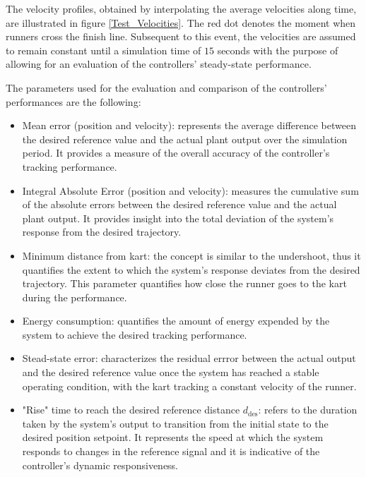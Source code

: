 \documentclass[a4paper,12pt,oneside]{book}
\begin{document}
The velocity profiles, obtained by interpolating the average velocities along time, are illustrated in figure \ref{Test_Velocities}.
The red dot denotes the moment when runners cross the finish line.
Subsequent to this event, the velocities are assumed to remain constant until a simulation time of $15$ seconds with the purpose of allowing for an evaluation of the controllers' steady-state performance.

\bigskip
The parameters used for the evaluation and comparison of the controllers' performances are the following:
\begin{itemize}
	\item Mean error (position and velocity): represents the average difference between the desired reference value and the actual plant output over the simulation period. It provides a measure of the overall accuracy of the controller's tracking performance.
	\item Integral Absolute Error (position and velocity): measures the cumulative sum of the absolute errors between the desired reference value and the actual plant output. It provides insight into the total deviation of the system's response from the desired trajectory.
	\item Minimum distance from kart: the concept is similar to the undershoot, thus it quantifies the extent to which the system's response deviates from the desired trajectory. This parameter quantifies how close the runner goes to the kart during the performance.
	\item Energy consumption: quantifies the amount of energy expended by the system to achieve the desired tracking performance.
	\item Stead-state error: characterizes the residual errror between the actual output and the desired reference value once the system has reached a stable operating condition, with the kart tracking a constant velocity of the runner.
	\item "Rise" time to reach the desired reference distance $d_\text{des}$: refers to the duration taken by the system's output to transition from the initial state to the desired position setpoint. It represents the speed at which the system responds to changes in the reference signal and it is indicative of the controller's dynamic responsiveness.
\end{itemize}
\end{document}
